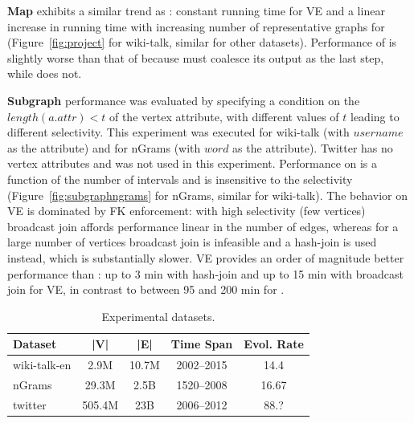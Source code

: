 {\bf Map} exhibits a similar trend
as : constant running time for VE and a linear increase
in running time with increasing number of representative graphs for
\sg (Figure~\ref{fig:project} for wiki-talk, similar for other
datasets).  Performance of  is slightly worse than that of
 because  must coalesce its output as the last
step, while  does not. 

{\bf Subgraph} performance was evaluated by specifying a condition on
the $length(a.attr)<t$ of the vertex attribute, with different values
of $t$ leading to different selectivity.  This experiment was executed
for wiki-talk (with $username$ as the attribute) and for nGrams (with
$word$ as the attribute).  Twitter has no vertex attributes and was
not used in this experiment.  Performance on \sg is a function of the
number of intervals and is insensitive to the selectivity
(Figure~\ref{fig:subgraphngrams} for nGrams, similar for wiki-talk).
The behavior on VE is dominated by FK enforcement: with high
selectivity (few vertices) broadcast join affords performance linear
in the number of edges, whereas for a large number of vertices
broadcast join is infeasible and a hash-join is used instead, which is
substantially slower.  VE provides an order of magnitude better
performance than \sg: up to 3 min with hash-join and up to 15 min with
broadcast join for VE, in contrast to between 95 and 200 min for \sg.

\begin{table}
\caption{Experimental datasets.}
\vspace{-0.1in}
\small
\begin{tabular}{l | c | c | c | c }
\hline
\multicolumn{1}{l|}{\bfseries Dataset} & \multicolumn{1}{c|}{\bfseries |V|} & \multicolumn{1}{c|}{\bfseries |E|} & \multicolumn{1}{c|}{\bfseries Time Span} & \multicolumn{1}{c}{\bfseries Evol. Rate} \\ \hline
wiki-talk-en & 2.9M & 10.7M & 2002--2015 & 14.4 \\ \hline
nGrams & 29.3M & 2.5B & 1520--2008 & 16.67 \\ \hline
twitter & 505.4M & 23B & 2006--2012 & 88.? \\ \hline
\end{tabular}
\vspace{-0.1cm}
\label{tab:datasets}
\end{table}

